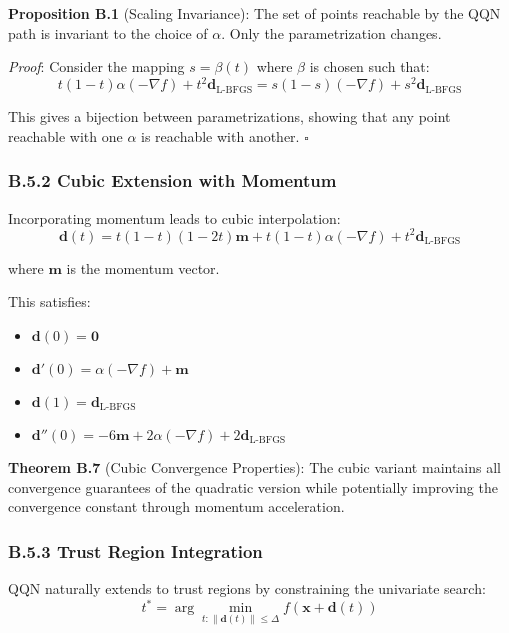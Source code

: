 \textbf{Proposition B.1} (Scaling Invariance): The set of points reachable by the QQN path is invariant to the choice of \(\alpha\). Only the parametrization changes.

\emph{Proof}: Consider the mapping \(s = \beta(t)\) where \(\beta\) is chosen such that:
\[t(1-t)\alpha(-\nabla f) + t^2 \mathbf{d}_{\text{L-BFGS}} = s(1-s)(-\nabla f) + s^2 \mathbf{d}_{\text{L-BFGS}}\]

This gives a bijection between parametrizations, showing that any point reachable with one \(\alpha\) is reachable with another. \(\square\)

\hypertarget{b.5.2-cubic-extension-with-momentum}{%
\subsubsection{B.5.2 Cubic Extension with Momentum}\label{b.5.2-cubic-extension-with-momentum}}

Incorporating momentum leads to cubic interpolation:
\[\mathbf{d}(t) = t(1-t)(1-2t)\mathbf{m} + t(1-t)\alpha(-\nabla f) + t^2 \mathbf{d}_{\text{L-BFGS}}\]

where \(\mathbf{m}\) is the momentum vector.

This satisfies:

\begin{itemize}
\tightlist
\item
  \(\mathbf{d}(0) = \mathbf{0}\)
\item
  \(\mathbf{d}'(0) = \alpha(-\nabla f) + \mathbf{m}\)
\item
  \(\mathbf{d}(1) = \mathbf{d}_{\text{L-BFGS}}\)
\item
  \(\mathbf{d}''(0) = -6\mathbf{m} + 2\alpha(-\nabla f) + 2\mathbf{d}_{\text{L-BFGS}}\)
\end{itemize}

\textbf{Theorem B.7} (Cubic Convergence Properties): The cubic variant maintains all convergence guarantees of the quadratic version while potentially improving the convergence constant through momentum acceleration.

\hypertarget{b.5.3-trust-region-integration}{%
\subsubsection{B.5.3 Trust Region Integration}\label{b.5.3-trust-region-integration}}

QQN naturally extends to trust regions by constraining the univariate search:
\[t^* = \arg\min_{t: \|\mathbf{d}(t)\| \leq \Delta} f(\mathbf{x} + \mathbf{d}(t))\]

